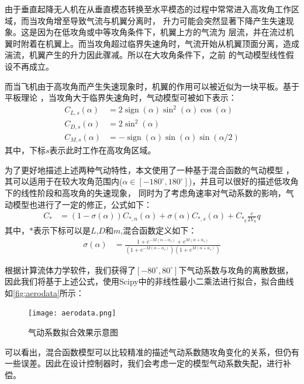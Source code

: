 由于垂直起降无人机在从垂直模态转换至水平模态的过程中常常进入高攻角工作区域\cite{argyle2016modeling}，而当攻角增至导致气流与机翼分离时，
升力可能会突然显著下降产生失速现象。这是因为在低攻角或中等攻角条件下，机翼上方的气流为
层流，并在流过机翼时附着在机翼上。而当攻角超过临界失速角时，气流开始从机翼顶面分离，造成湍流，机翼产生的升力因此骤减。所以在大攻角条件下，之前
的气动模型线性假设不再成立。

而当飞机由于高攻角而产生失速现象时，机翼的作用可以被近似为一块平板\cite{stengel2005flight}。基于平板理论
\cite{kikumoto2022back,stengel2005flight,puopolo2013comparison,beard2012small}，当攻角大于临界失速角时，气动模型可被如下表示：
\begin{align}
    C_{L,s}(\alpha) & =2 \operatorname{sign}(\alpha) \sin ^{2}(\alpha) \cos (\alpha) \\
    C_{D,s}(\alpha) & =2 \sin ^{2}(\alpha) \\
    C_{M,s}(\alpha) & =-\operatorname{sign}(\alpha) \sin (\alpha) \sin (\alpha / 2)
\end{align}
其中，下标$s$表示此时工作在高攻角区域。

为了更好地描述上述两种气动特性，本文使用了一种基于混合函数的气动模型
，其可以适用于在较大攻角范围内($\alpha\in \left [ -180^\circ, 180^\circ\right ] $)，并且可以很好的描述低攻角下的线性阶段和高攻角的失速现象，
同时为了考虑角速率对气动系数的影响，气动模型也进行了一定的修正，公式如下\cite{kikumoto2022back,beard2012small}：
\begin{align}
    C_{*} & = (1-\sigma(\alpha))C_{*,n}(\alpha)+\sigma(\alpha)C_{*,s}(\alpha) + C_{*_{q}}\frac{c}{2V_{a}}q
    \label{eq:aero}
\end{align}
其中，$*$表示下标可以是$L$,$D$和$m$,混合函数定义如下：
\begin{align}
    \sigma(\alpha) & = \frac{1+e^{-M\left(\alpha-\alpha_{s}\right)}+e^{M\left(\alpha+\alpha_{s}\right)}}{\left(1+e^{-M\left(\alpha-\alpha_{s}\right)}\right)\left(1+e^{M\left(\alpha+\alpha_{s}\right)}\right)}
\end{align}

根据计算流体力学软件，我们获得了$\left [-80^\circ, 80^\circ\right]$下气动系数与攻角的离散数据，因此我们将基于上述公式，使用Scipy中的非线性最小二乘法进行拟合，拟合曲线如\autoref{fig:aerodata}所示：
\begin{figure}[htbp]
    \centering
    \texttt{[image: aerodata.png]}
    \caption{\label{fig:aerodata}气动系数拟合效果示意图}
\end{figure}

可以看出，混合函数模型可以比较精准的描述气动系数随攻角变化的关系，但仍有一些误差。因此在设计控制器时，我们会考虑一定的模型气动系数失配，进行补偿。

